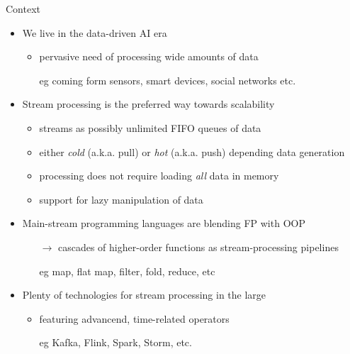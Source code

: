 \documentclass[presentation]{beamer}
\begin{document}
\begin{frame}[allowframebreaks]{Context}
    
    \begin{itemize}
        \item We live in the data-driven AI era
        \begin{itemize}
            \item pervasive need of processing wide amounts of data
            \item[eg] coming form sensors, smart devices, social networks etc.
        \end{itemize}
        
        \bigskip
        
        \item Stream processing is the preferred way towards \alert{scalability}
        \begin{itemize}
            \item streams as possibly \alert{unlimited FIFO queues} of data
            \item either \emph{cold} (a.k.a. \alert{pull}) or \emph{hot} (a.k.a. \alert{push}) depending data \alert{generation}
            \item processing does not require loading \emph{all} data in memory
            \item support for \alert{lazy} manipulation of data
        \end{itemize}
        
        \framebreak
        
        \item Main-stream programming languages are blending FP with OOP
        \begin{itemize}
            \item[$\rightarrow$] cascades of higher-order functions as stream-processing pipelines
            \item[eg] map, flat map, filter, fold, reduce, etc 
        \end{itemize}
        
        \bigskip
        
        \item Plenty of technologies for stream processing \alert{in the large}
        \begin{itemize}
            \item featuring advancend, time-related operators 
            \item[eg] Kafka, Flink, Spark, Storm, etc.
        \end{itemize}
        
    \end{itemize}
\end{frame}
\end{document}
